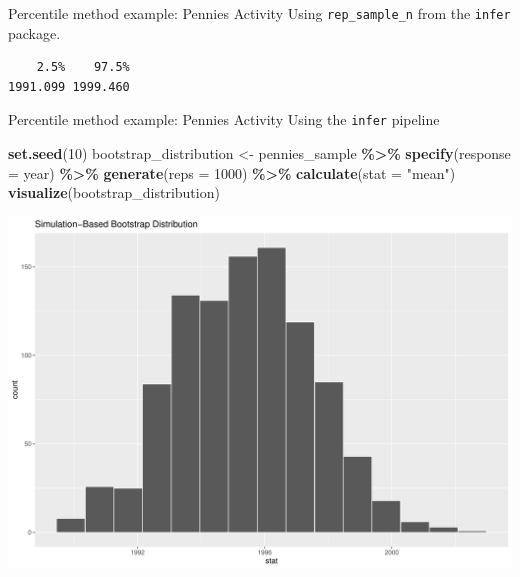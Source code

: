 \documentclass[
  ignorenonframetext,
]{beamer}
\newenvironment{Shaded}{\begin{snugshade}}{\end{snugshade}}
\newcommand{\AttributeTok}[1]{\textcolor[rgb]{0.13,0.29,0.53}{#1}}
\newcommand{\DecValTok}[1]{\textcolor[rgb]{0.00,0.00,0.81}{#1}}
\newcommand{\FloatTok}[1]{\textcolor[rgb]{0.00,0.00,0.81}{#1}}
\newcommand{\FunctionTok}[1]{\textcolor[rgb]{0.13,0.29,0.53}{\textbf{#1}}}
\newcommand{\NormalTok}[1]{#1}
\newcommand{\OtherTok}[1]{\textcolor[rgb]{0.56,0.35,0.01}{#1}}
\newcommand{\SpecialCharTok}[1]{\textcolor[rgb]{0.81,0.36,0.00}{\textbf{#1}}}
\newcommand{\StringTok}[1]{\textcolor[rgb]{0.31,0.60,0.02}{#1}}
\begin{document}
\begin{frame}[fragile]{Percentile method example: Pennies Activity}
\protect\hypertarget{percentile-method-example-pennies-activity-1}{}
Using \texttt{rep\_sample\_n} from the \texttt{infer} package.

\begin{Shaded}
\end{Shaded}

\begin{verbatim}
    2.5%    97.5% 
1991.099 1999.460 
\end{verbatim}
\end{frame}

\begin{frame}[fragile]{Percentile method example: Pennies Activity}
\protect\hypertarget{percentile-method-example-pennies-activity-2}{}
Using the \texttt{infer} pipeline

\tiny

\begin{Shaded}
\begin{Highlighting}[]
\FunctionTok{set.seed}\NormalTok{(}\DecValTok{10}\NormalTok{)}
\NormalTok{bootstrap\_distribution }\OtherTok{\textless{}{-}}\NormalTok{ pennies\_sample }\SpecialCharTok{\%\textgreater{}\%} 
  \FunctionTok{specify}\NormalTok{(}\AttributeTok{response =}\NormalTok{ year) }\SpecialCharTok{\%\textgreater{}\%} 
  \FunctionTok{generate}\NormalTok{(}\AttributeTok{reps =} \DecValTok{1000}\NormalTok{) }\SpecialCharTok{\%\textgreater{}\%} 
  \FunctionTok{calculate}\NormalTok{(}\AttributeTok{stat =} \StringTok{"mean"}\NormalTok{)}
\FunctionTok{visualize}\NormalTok{(bootstrap\_distribution)}
\end{Highlighting}
\end{Shaded}

\begin{center}\includegraphics[width=0.7\linewidth,height=0.5\textheight]{Week10_Lect_files/figure-beamer/unnamed-chunk-13-1} \end{center}
\normalsize
\end{frame}
\end{document}
